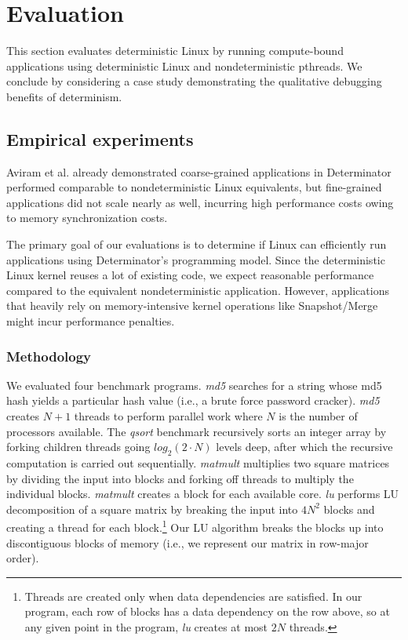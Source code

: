 
\section{Evaluation}
\label{sec:eval}

This section evaluates deterministic Linux by running compute-bound
applications using deterministic Linux and nondeterministic pthreads.
We conclude by considering a case study demonstrating the qualitative debugging
benefits of determinism.

\subsection{Empirical experiments}

Aviram et al. already demonstrated coarse-grained applications in Determinator
performed comparable to nondeterministic Linux equivalents, but fine-grained
applications did not scale nearly as well, incurring high performance costs
owing to memory synchronization costs.






The primary goal of our evaluations is to determine if Linux can efficiently run
applications using Determinator's programming model. Since the deterministic
Linux kernel reuses a lot of existing code, we expect reasonable
performance compared to the equivalent nondeterministic application. However,
applications that heavily rely on memory-intensive kernel operations like
Snapshot/Merge might incur performance penalties.

\subsubsection{Methodology}
We evaluated four benchmark programs. \emph{md5} searches for a string whose
md5 hash yields a particular hash value (i.e., a brute force password cracker).
\emph{md5} creates $N+1$ threads to perform parallel work where $N$ is the
number of processors available. The \emph{qsort} benchmark recursively sorts an
integer array by forking children threads going $log_2(2\cdot N)$ levels deep,
after which the recursive computation is carried out sequentially.
\emph{matmult} multiplies two square matrices by dividing the input into
blocks and forking off threads to multiply the individual blocks. \emph{matmult}
creates a block for each available core. \emph{lu}
performs LU decomposition of a square matrix by breaking the input into $4N^2$
blocks and creating a thread for each block.\footnote{Threads are created only
when data dependencies are satisfied. In our program, each row of blocks has a
data dependency on the row above, so at any given point in the program,
\emph{lu} creates at most $2N$ threads.}
Our LU algorithm breaks the blocks up into discontiguous blocks of memory (i.e.,
we represent our matrix in row-major order).

